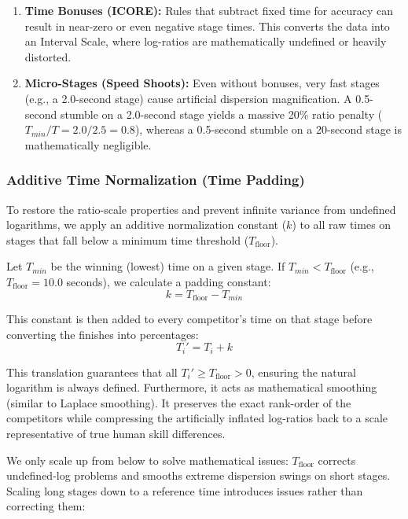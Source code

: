 \documentclass[12pt]{article}
\begin{document}
	\begin{enumerate}
		\item \textbf{Time Bonuses (ICORE):} Rules that subtract fixed time for accuracy can result in near-zero or even negative stage times. This converts the data into an Interval Scale, where log-ratios are mathematically undefined or heavily distorted.
		\item \textbf{Micro-Stages (Speed Shoots):} Even without bonuses, very fast stages (e.g., a 2.0-second stage) cause artificial dispersion magnification. A 0.5-second stumble on a 2.0-second stage yields a massive 20\% ratio penalty ($T_{min}/T = 2.0 / 2.5 = 0.8$), whereas a 0.5-second stumble on a 20-second stage is mathematically negligible.
	\end{enumerate}

	\subsubsection*{Additive Time Normalization (Time Padding)}
	To restore the ratio-scale properties and prevent infinite variance from undefined logarithms, we apply an additive normalization constant ($k$) to all raw times on stages that fall below a minimum time threshold ($T_{\mathrm{floor}}$).

	Let $T_{min}$ be the winning (lowest) time on a given stage. If $T_{min} < T_{\mathrm{floor}}$ (e.g., $T_{\mathrm{floor}} = 10.0$ seconds), we calculate a padding constant:
	\begin{equation}
		k = T_{\mathrm{floor}} - T_{min}
	\end{equation}

	This constant is then added to every competitor's time on that stage before converting the finishes into percentages:
	\begin{equation}
		T_i' = T_i + k
	\end{equation}

	This translation guarantees that all $T_i' \geq T_{\mathrm{floor}} > 0$, ensuring the natural logarithm is always defined. Furthermore, it acts as mathematical smoothing (similar to Laplace smoothing). It preserves the exact rank-order of the competitors while compressing the artificially inflated log-ratios back to a scale representative of true human skill differences.

	We only scale up from below to solve mathematical issues: $T_{\mathrm{floor}}$ corrects undefined-log problems and smooths extreme dispersion swings on short stages. Scaling long stages down to a reference time introduces issues rather than correcting them:
\end{document}
